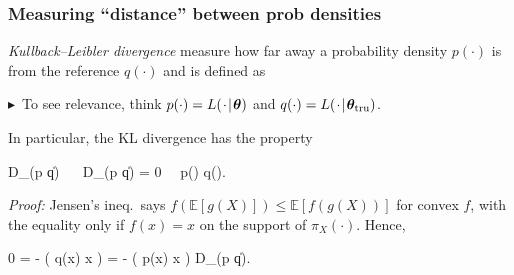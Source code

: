 \documentclass[18pt]{beamer}
\newcommand{\defineTightItemizeSpacing}{%
	\setlength{\abovedisplayskip}{.25\baselineskip}%
	\setlength{\belowdisplayskip}{.25\baselineskip}%
}
\newenvironment{tightEquation*}{%
	\defineTightItemizeSpacing%
	\begin{equation*}
}{
	\end{equation*} \ignorespacesafterend
}
\newcommand{\noteBullet}{\hspace*{.75em}\textcolor{themecolor}{$\blacktriangleright$}\ }
\newcommand{\given}{\thinnerspace | \thinnerspace}
\newcommand{\defeq}{\vcentcolon =} %
\newcommand{\diff}{\operatorname{\mathrm{d}}\!{}}
\newcommand{\thinnerspace}{\mskip.5\thinmuskip}
\newcommand{\thinnestspace}{\mskip.25\thinmuskip}
\newcommand{\expectation}{\mathbb{E}}
\newcommand{\kldivergence}{D_{\mathrm{KL}}}
\newcommand{\truthSub}{\mathrm{tru}}
\newcommand{\density}{\pi}
\newcommand{\likelihood}{L}
\newcommand{\btheta}{\bm{\theta}}
\begin{document}
\begin{frame}
\frametitle{Measuring ``distance'' between prob densities}
\textit{Kullback–Leibler divergence} measure how far away a probability density $p(\cdot)$ is from the reference $q(\cdot)$ and is defined as
\pause%
\noteBullet To see relevance, think $p(\cdot) = \likelihood(\thinnerspace \cdot \given \btheta)$ and $q(\cdot) = \likelihood(\thinnerspace \cdot \given \btheta_\truthSub)$.

\pause
\smallskip
In particular, the KL divergence has the property 
\begin{tightEquation*}
\kldivergence(p \| q) 
	\  \
	\kldivergence(p \| q) = 0 \,  \, p(\cdot) \equiv q(\cdot).
\end{tightEquation*}

\pause
\textit{Proof:} 
Jensen's ineq.\ says $f(\expectation[g(X)]) \leq \expectation[f(g(X))]$ for convex $f$, with the equality only if $f(x) = x$ on the support of $\density_X(\cdot)$.
\pause%
Hence,
\begin{tightEquation*}
0 = - \log\!\left( \int q(x) \diff x \right)
	= - \log\!\left( \int {} p(x) \diff x \right)
	\leq \kldivergence(p \| q).
\end{tightEquation*}
\end{frame}
\end{document}
